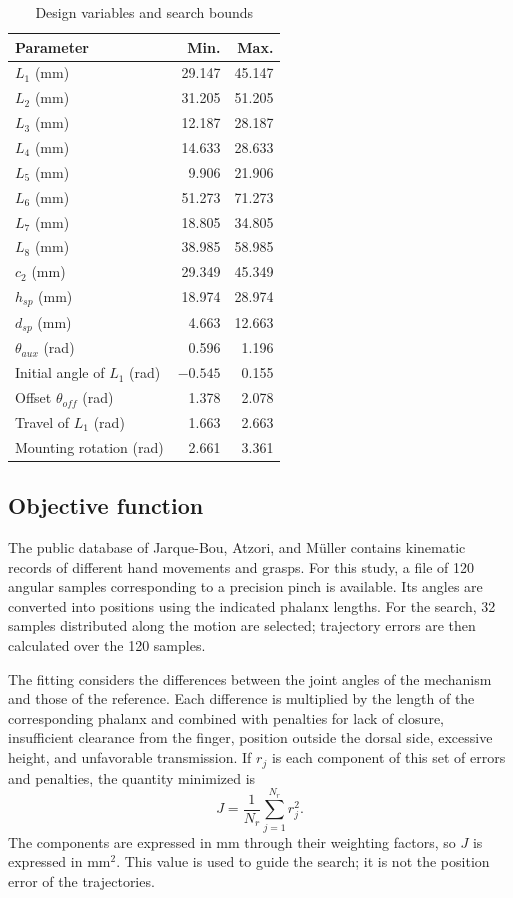 \documentclass[conference,letterpaper]{IEEEtran}
\begin{document}
\begin{table}[t]
\caption{Design variables and search bounds}
\label{tab:limites}\centering\footnotesize
\begin{tabular}{lrr}\toprule Parameter & Min. & Max.\\\midrule
$L_1$ (mm)&29.147&45.147\\ $L_2$ (mm)&31.205&51.205\\
$L_3$ (mm)&12.187&28.187\\ $L_4$ (mm)&14.633&28.633\\
$L_5$ (mm)&9.906&21.906\\ $L_6$ (mm)&51.273&71.273\\
$L_7$ (mm)&18.805&34.805\\ $L_8$ (mm)&38.985&58.985\\
$c_2$ (mm)&29.349&45.349\\ $h_{sp}$ (mm)&18.974&28.974\\
$d_{sp}$ (mm)&4.663&12.663\\ $\theta_{aux}$ (rad)&0.596&1.196\\
Initial angle of $L_1$ (rad)&$-0.545$&0.155\\
Offset $\theta_{off}$ (rad)&1.378&2.078\\
Travel of $L_1$ (rad)&1.663&2.663\\
Mounting rotation (rad)&2.661&3.361\\\bottomrule
\end{tabular}
\end{table}

\subsection{Objective function}
The public database of Jarque-Bou, Atzori, and Müller \cite{r1} contains kinematic records of different hand movements and grasps. For this study, a file of 120 angular samples corresponding to a precision pinch is available. Its angles are converted into positions using the indicated phalanx lengths. For the search, 32 samples distributed along the motion are selected; trajectory errors are then calculated over the 120 samples.

The fitting considers the differences between the joint angles of the mechanism and those of the reference. Each difference is multiplied by the length of the corresponding phalanx and combined with penalties for lack of closure, insufficient clearance from the finger, position outside the dorsal side, excessive height, and unfavorable transmission. If $r_j$ is each component of this set of errors and penalties, the quantity minimized is
\begin{equation}
J=\frac{1}{N_r}\sum_{j=1}^{N_r}r_j^2.
\label{eq:objetivo}
\end{equation}
The components are expressed in mm through their weighting factors, so $J$ is expressed in mm$^2$. This value is used to guide the search; it is not the position error of the trajectories.
\end{document}
